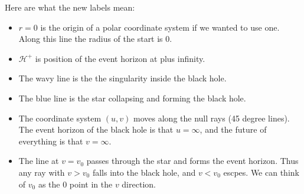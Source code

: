 \documentclass[12pt,border=3pt,tikz]{article}
\begin{document}
Here are what the new labels mean:

\begin{itemize}
\item $r=0$ is the origin of a polar coordinate system if we wanted to use one. Along this line the
radius of the start is $0$.
\item ${\mathcal H}^+$ is position of the event horizon at plus infinity.
\item The wavy line is the the singularity inside the black hole.
\item The blue line is the star collapsing and forming the black hole.
\item The coordinate system $(u,v)$ moves along the null rays (45 degree lines). The event
horizon of the black hole is that $u=\infty$, and the future of everything is that $v=\infty$.
\item The line at $v=v_0$  passes through the star and forms the
event horizon. Thus any ray with $v > v_0$ falls into the black hole, and $v < v_0$ escpes. 
We can think of $v_0$ as the $0$ point in the $v$ direction.
\end{itemize}
\end{document}
